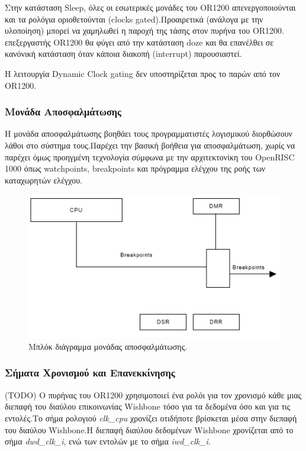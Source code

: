 \documentclass[a4paper,10pt]{article}
\numberwithin{figure}{subsection}
\numberwithin{table}{subsection}
\begin{document}
{Στην κατάσταση Sleep, όλες οι εσωτερικές μονάδες του OR1200 απενεργοποιούνται και τα 
ρολόγια οριοθετούνται (clocks gated).Προαιρετικά (ανάλογα με την υλοποίηση) μπορεί να χαμηλωθεί 
η παροχή της τάσης στον πυρήνα του OR1200. επεξεργαστής OR1200 θα φύγει από την κατάσταση doze και 
θα επανέλθει σε κανόνική κατάσταση όταν κάποια διακοπή (interrupt) παρουσιαστεί.
\newline

Η λειτουργία Dynamic Clock gating δεν υποστηρίζεται προς το παρών από τον OR1200. 

\subsubsection{Μονάδα Αποσφαλμάτωσης}

Η μονάδα αποσφαλμάτωσης βοηθάει τους προγραμματιστές λογισμικού διορθώσουν λάθοι στο σύστημα
τους.Παρέχει την βασική βοήθεια για αποσφαλμάτωση, χωρίς να παρέχει όμως προηγμένη τεχνολογία
σύμφωνα με την αρχιτεκτονίκη του OpenRISC 1000 όπως watchpoints, breakpoints και πρόγραμμα
ελέγχου της ροής των καταχωρητών ελέγχου.

\vspace{0.7cm}
\begin{figure}[h!]
 \centering
 \includegraphics[bb=0 0 869 498,scale=0.38]{./Images/debug_unit.png}
 \caption{Μπλόκ διάγραμμα μονάδας αποσφαλμάτωσης.}
\end{figure}
\vspace{0.7cm}

\subsubsection{Σήματα Χρονισμού και Επανεκκίνησης}
(TODO)
O πυρήνας του OR1200 χρησιμοποιεί ένα ρολόι για τον χρονισμό κάθε μιας διεπαφή του διαύλου
επικοινωνίας Wishbone τόσο για τα δεδομένα όσο και για τις εντολές.Το σήμα ρολογιού \emph{clk\_cpu}
χρονίζει οτιδήποτε βρίσκεται μέσα στην διεπαφή του διαύλου Wishbone.Η διεπαφή διαύλου δεδομένων
Wishbone χρονίζεται από το σήμα \emph{dwd\_clk\_i}, ενώ των εντολών με το σήμα \emph{iwd\_clk\_i}.
\newline

}
\end{document}
